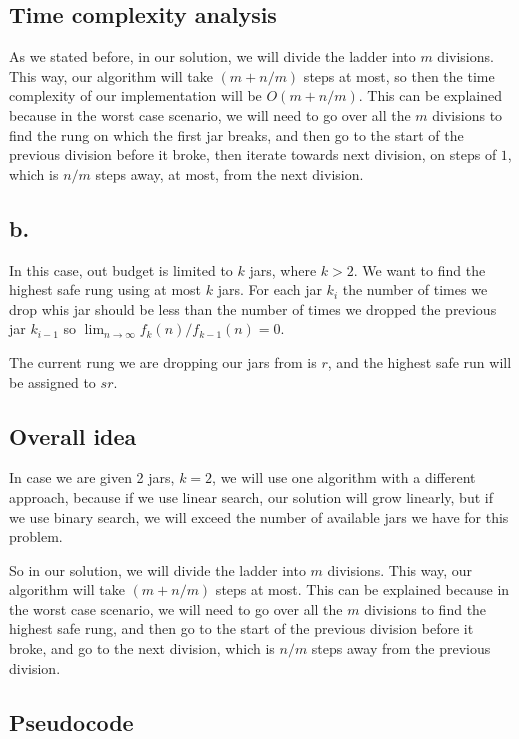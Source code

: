 \documentclass{article}
\begin{document}
\subsection*{Time complexity analysis}

As we stated before, in our solution, we will divide the ladder into $m$ divisions. This way, our algorithm will take $(m+n/m)$ steps at most, so then the time complexity of our implementation will be $O(m+n/m)$. This can be explained because in the worst case scenario, we will need to go over all the $m$ divisions to find the rung on which the first jar breaks, and then go to the start of the previous division before it broke, then iterate towards next division, on steps of $1$, which is $n/m$ steps away, at most, from the next division.

\subsection*{b.}

In this case, out budget is limited to $k$ jars, where $k>2$. We want to find the highest safe rung using at most $k$ jars. For each jar $k_i$ the number of times we drop whis jar should be less than the number of times we dropped the previous jar $k_{i-1}$ so $\lim_{n\to\infty} f_k(n)/f_{k-1}(n) = 0$.

The current rung we are dropping our jars from is $r$, and the highest safe run will be assigned to $sr$.

\subsection*{Overall idea}

In case we are given 2 jars, $k = 2$, we will use one algorithm with a different approach, because if we use linear search, our solution will grow linearly, but if we use binary search, we will exceed the number of available jars we have for this problem.

So in our solution, we will divide the ladder into $m$ divisions. This way, our algorithm will take $(m+n/m)$ steps at most. This can be explained because in the worst case scenario, we will need to go over all the $m$ divisions to find the highest safe rung, and then go to the start of the previous division before it broke, and go to the next division, which is $n/m$ steps away from the previous division.

\subsection*{Pseudocode}
\end{document}
